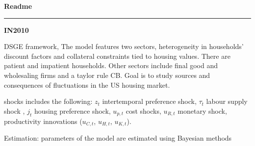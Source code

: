 \documentclass[12pt, a4paper]{article}
\begin{document}
	
\normalsize

\begin{flushleft}
{\large\bf Readme}
\end{flushleft}
\medskip\hrule height 1pt
\begin{flushright}
{\large\bf IN2010}
\end{flushright}


DSGE framework, The model features two sectors, heterogeneity in households’ discount factors and collateral constraints tied to housing values. There are patient and impatient households. Other sectors include final good and wholesaling firms and a taylor rule CB. Goal is to study  sources and consequences of fluctuations in the US housing market.

shocks includes the following: $z_{t}$ intertemporal preference shock, $\tau_{t}$ labour supply shock , $j_{t}$ housing preference shock, $u_{p,t}$ cost shocks, $u_{R,t}$ monetary shock, productivity innovations ($u_{C,t}$, $u_{H,t}$, $u_{K,t}$).

Estimation: parameters of the model are estimated using Bayesian methods
\end{document}
